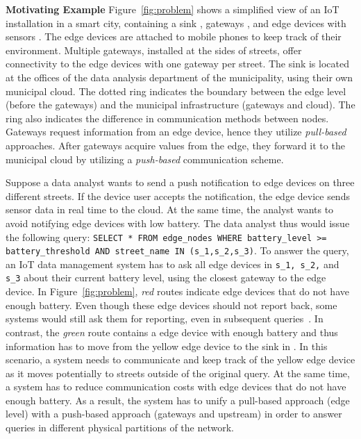 \textbf{Motivating Example}
Figure~\ref{fig:problem} 
shows a simplified view of an IoT installation in a smart city, containing a sink \textInvertedTriangle, gateways 
\textDiamond, and edge devices with sensors \textCircle. The edge devices are attached to mobile phones to keep track of their environment. Multiple gateways, installed at the sides of streets, offer connectivity to the edge devices with one gateway per street. The sink is located at the offices of the data analysis department of the municipality, using their own municipal cloud. The dotted ring indicates the boundary between the edge level (before the gateways) and the municipal infrastructure (gateways and cloud). The ring also indicates the difference in communication methods between nodes. Gateways request information from an edge device, hence they utilize \textit{pull-based} approaches. After gateways acquire values from the edge, they forward it to the municipal cloud by utilizing a \textit{push-based} communication scheme.

Suppose a data analyst wants to send a push notification to edge devices on three different streets. If the device user accepts the notification, the edge device sends sensor data in real time to the cloud. At the same time, the analyst wants to avoid notifying edge devices with low battery. The data analyst thus would issue the following query: \texttt{SELECT * FROM edge\_nodes WHERE battery\_level >= battery\_threshold AND street\_name IN (s\_1,s\_2,s\_3)}.
%
To answer the query, an IoT data management system has to ask all edge devices in \texttt{s\_1, s\_2,} and \texttt{s\_3} about their current battery level, using the closest gateway to the edge device.
%
In Figure~\ref{fig:problem}, \textit{red} routes indicate edge devices that do not have enough battery.
Even though these edge devices should not report back, some systems would still ask them for reporting, even in subsequent queries~\cite{aggarwal2013managing, woo2001transmission}.
% 
In contrast, the \textit{green} route contains a edge device with enough battery and thus information has to move from the yellow edge device to the sink in \textInvertedTriangle.
%
In this scenario, a system needs to communicate and keep track of the yellow edge device as it moves potentially to streets outside of the original query.
At the same time, a system has to reduce communication costs with edge devices that do not have enough battery. 
As a result, the system has to unify a pull-based approach (edge level) with a push-based approach (gateways and upstream) in order to answer queries in different physical partitions of the network. 
%

